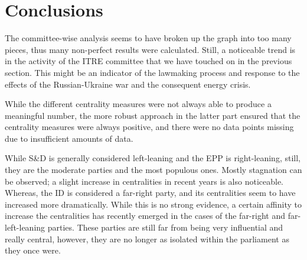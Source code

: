 \documentclass[lettersize,journal]{IEEEtran}
\begin{document}
\section{Conclusions} \label{sec:conclusions}

The committee-wise analysis seems to have broken up the graph into too many pieces, thus many non-perfect results were calculated. Still, a noticeable trend is in the activity of the ITRE committee that we have touched on in the previous section. This might be an indicator of the lawmaking process and response to the effects of the Russian-Ukraine war and the consequent energy crisis. 

While the different centrality measures were not always able to produce a meaningful number, the more robust approach in the latter part ensured that the centrality measures were always positive, and there were no data points missing due to insufficient amounts of data. %

While S\&D is generally considered left-leaning and the EPP is right-leaning, still, they are the moderate parties and the most populous ones. Mostly stagnation can be observed; a slight increase in centralities in recent years is also noticeable. Whereas, the ID is considered a far-right party, and its centralities seem to have increased more dramatically. While this is no strong evidence, a certain affinity to increase the centralities has recently emerged in the cases of the far-right and far-left-leaning parties. These parties are still far from being very influential and really central, however, they are no longer as isolated within the parliament as they once were.
\end{document}
